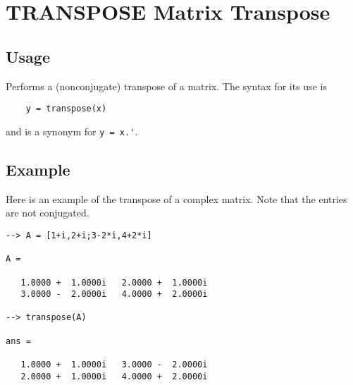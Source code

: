 \section{TRANSPOSE Matrix Transpose }

\subsection{Usage}

Performs a (nonconjugate) transpose of a matrix.  The syntax for
its use is
\begin{verbatim}
    y = transpose(x)
\end{verbatim}
and is a synonym for \verb|y = x.'|.
\subsection{Example}

Here is an example of the transpose of a complex matrix.  Note that
the entries are not conjugated.
\begin{verbatim}
--> A = [1+i,2+i;3-2*i,4+2*i]

A = 

   1.0000 +  1.0000i   2.0000 +  1.0000i 
   3.0000 -  2.0000i   4.0000 +  2.0000i 

--> transpose(A)

ans = 

   1.0000 +  1.0000i   3.0000 -  2.0000i 
   2.0000 +  1.0000i   4.0000 +  2.0000i 
\end{verbatim}
